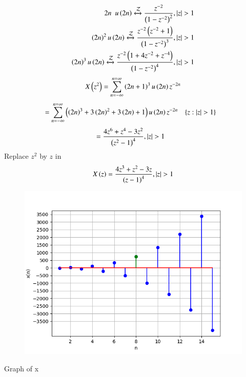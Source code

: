 \documentclass[beamer]{IEEEtran}
\theoremstyle{remark}
\begin{document}
\begin{align}
	{2n} \hspace{5pt} u\left(2n\right) \xleftrightarrow{\mathcal{Z}} \frac{z^{-2}}{\left(1-z^{-2}\right)^2},\left\vert z\right\vert >1 \\
    \left(2n\right)^2  u\left(2n\right) \xleftrightarrow{\mathcal{Z}} \frac{z^{-2}\left(z^{-2}+1\right)}{\left(1-z^{-2}\right)^3},\left\vert z\right\vert > 1 \\
	\left(2n\right)^3 u\left(2n\right) \xleftrightarrow{\mathcal{Z}}  \frac{z^{-2}\left(1+4z^{-2}+z^{-4}\right)}{\left(1-z^{-2}\right)^4},\left\vert z\right\vert >1
\end{align}
\begin{align}
	X\left(z^2\right)=\sum_{n=-\infty}^{n=\infty}\left(2n+1\right)^{3}u\left(2n\right)z^{-2n}
\end{align}
\begin{align}
	&=\sum_{n=-\infty}^{n=\infty}\brak{\brak{2n}^3+3\brak{2n}^2+3\brak{2n}+1}u\brak{2n}z^{-2n}\hspace{10pt}
\{z:|z|>1\}
\end{align} 
\begin{align}
	&=\frac{4z^6+z^4-3z^2}{\left(z^2-1\right)^4}, \left\vert z\right\vert>1 
\end{align}
Replace $z^2$ by $z$ in 
\begin{align}
	X\left(z\right)=\frac{4z^3+z^2-3z}{\left(z-1\right)^4} , \left\vert z\right\vert>1
\end{align}

\begin{figure}[h]
    \centering
    \includegraphics[width=1 \columnwidth]{figs/graph.png} 
    \label{fig:11.9.1.9.1}
\end{figure}
\begin{center}
Graph of x
   \end{center}
\end{document}
